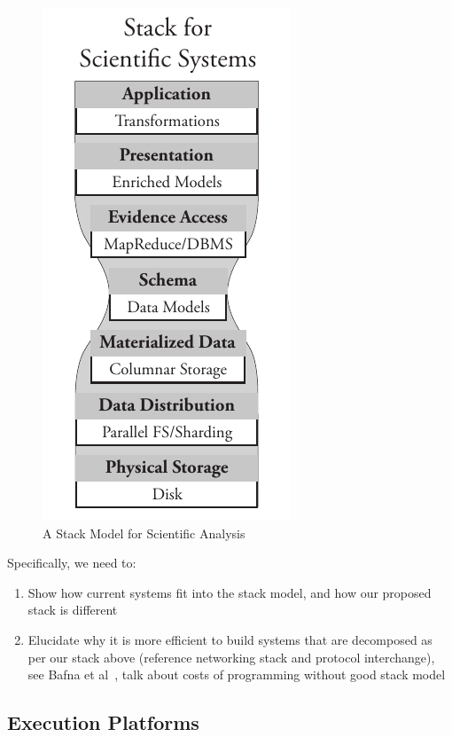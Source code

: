 \documentclass{acm_proc_article-sp}
\begin{document}
\begin{figure}[h]
\begin{center}
\includegraphics[width=0.6\linewidth]{stack-model.pdf}
\end{center}
\caption{A Stack Model for Scientific Analysis}
\label{fig:stack-model}
\end{figure}

Specifically, we need to:

\begin{enumerate}
\item Show how current systems fit into the stack model, and how our proposed stack is different
\item Elucidate why it is more efficient to build systems that are decomposed as per our stack above
(reference networking stack and protocol interchange), see Bafna et al~\cite{bafna13}, talk about costs
of programming without good stack model
\end{enumerate}

\subsection{Execution Platforms}
\label{sec:execution-platforms}
\end{document}
